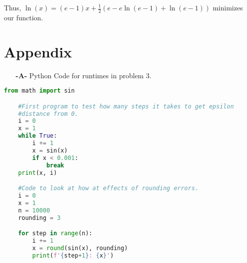 \documentclass[11pt]{article}
\theoremstyle{definition}
\newcommand{\1}[1]{\mathbf{1} \left \{ #1 \right \}}
\begin{document}
Thus, \(\ln(x) = (e - 1)x + \frac{1}{2}\left(e - e\ln(e-1) + \ln(e-1)\right)\) minimizes our function.

\section{Appendix}

\begin{itemize}
    \item[{\textbf{-A-}}] Python Code for runtimes in problem 3.
\end{itemize}
\begin{lstlisting}[language=Python]
    from math import sin

    #First program to test how many steps it takes to get epsilon
    #distance from 0.
    i = 0
    x = 1
    while True:
        i += 1
        x = sin(x)
        if x < 0.001:
            break
    print(x, i)

    #Code to look at how at effects of rounding errors.
    i = 0
    x = 1
    n = 10000
    rounding = 3

    for step in range(n):
        i += 1
        x = round(sin(x), rounding)
        print(f'{step+1}: {x}')
\end{lstlisting}
\end{document}
